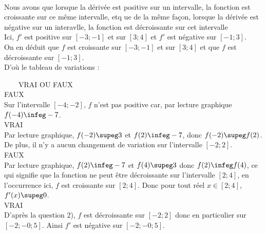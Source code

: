 \documentclass[a4paper, 11pt, oneside]{memoir}
\begin{document}

\setcounter{tocdepth}{3}
\tableofcontents*

\setcounter{chapitre}{6}

\clearpage
\begin{questions}
\setcounter{exercice}{30}

\exercice\\
Nous avons que lorsque la dérivée est positive sur un intervalle, la fonction est croissante sur ce même intervalle, etq ue de la même façon, lorsque la dérivée est négative sur un interavlle, la fonction est décroissante sur cet intervalle\\

Ici, $f'$ est positive sur $[-3;-1]$ et sur $[3;4]$ et $f'$ est négative sur $[-1;3]$.\\
On en déduit que $f$ est croissante sur $[-3;-1]$ et sur $[3;4]$ et que $f$ est décroissante sur $[-1;3]$.\\

D'où le tableau de variations :



\exercice ~~~~VRAI OU FAUX\\
\question FAUX\\
Sur l'intervalle $[-4;-2]$, $f$ n'est pas positive car, par lecture graphique $f(-4) \infeg -7 $.\\
\question VRAI\\
Par lecture graphique, $f(-2) \supeg 3 $ et $f(2) \infeg -7$, donc $f(-2) \supeg f(2)$. De plus, il n'y a aucun changement de variation sur l'intervalle $[-2;2]$.\\
\question FAUX\\
Par lecture graphique, $f(2) \infeg -7$ et $f(4) \supeg 3$ donc $f(2) \infeg f(4)$, ce qui signifie que la fonction ne peut être décroissante sur l'intervalle $[2;4]$, en l'occurrence ici, $f$ est croissante sur $[2;4]$. Donc pour tout réel $x\in[2;4]$, $f'(x) \supeg 0$.\\
\question VRAI\\
D'après la question 2), $f$ est décroissante sur $[-2;2]$ donc en particulier sur $[-2;-0;5]$. Ainsi $f'$ est négative sur $[-2;-0;5]$.\\


\end{questions}
\end{document}
